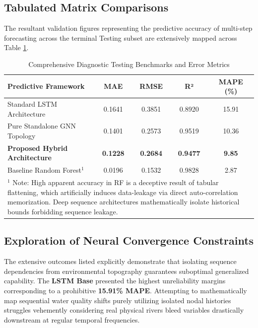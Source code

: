 \documentclass[journal,10pt,twocolumn]{IEEEtran}
\begin{document}
\subsection{Tabulated Matrix Comparisons}
The resultant validation figures representing the predictive accuracy of multi-step forecasting across the terminal Testing subset are extensively mapped across Table \ref{tab:detailed_metrics_full}.

\begin{table}[htbp]
\caption{Comprehensive Diagnostic Testing Benchmarks and Error Metrics}
\begin{center}
\renewcommand{\arraystretch}{1.5}
\begin{tabularx}{\columnwidth}{X c c c c}
\toprule
\textbf{Predictive Framework} & \textbf{MAE} & \textbf{RMSE} & \textbf{R²} & \textbf{MAPE (\%)} \\
\midrule
Standard LSTM Architecture         & 0.1641 & 0.3851 & 0.8920 & 15.91 \\
Pure Standalone GNN Topology       & 0.1401 & 0.2573 & 0.9519 & 10.36 \\
\textbf{Proposed Hybrid Architecture} & \textbf{0.1228} & \textbf{0.2684} & \textbf{0.9477} & \textbf{9.85} \\
\midrule
Baseline Random Forest$^{1}$       & 0.0196 & 0.1532 & 0.9828 & 2.87 \\
\bottomrule
\multicolumn{5}{p{0.95\columnwidth}}{\footnotesize $^{1}$ Note: High apparent accuracy in RF is a deceptive result of tabular flattening, which artificially induces data-leakage via direct auto-correlation memorization. Deep sequence architectures mathematically isolate historical bounds forbidding sequence leakage.}
\end{tabularx}
\label{tab:detailed_metrics_full}
\end{center}
\end{table}

\subsection{Exploration of Neural Convergence Constraints}
The extensive outcomes listed explicitly demonstrate that isolating sequence dependencies from environmental topography guarantees suboptimal generalized capability. The \textbf{LSTM Base} presented the highest unreliability margins corresponding to a prohibitive \textbf{15.91\% MAPE}. Attempting to mathematically map sequential water quality shifts purely utilizing isolated nodal histories struggles vehemently considering real physical rivers bleed variables drastically downstream at regular temporal frequencies.
\end{document}
